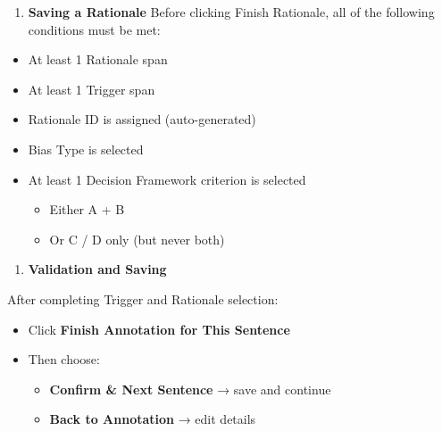 \documentclass[12pt,oneside,openright,a4paper]{cpe-english-project}
\begin{document}
\begin{enumerate}
\setlength{\itemsep}{0.15\baselineskip}
\setlength{\parsep}{0pt}
\setlength{\parskip}{0pt}
\def\labelenumi{\arabic{enumi})}
\setcounter{enumi}{4}
\item
  \textbf{Saving a Rationale}
  Before clicking Finish Rationale, all of the following conditions must
  be met:
\end{enumerate}

\begin{itemize}
\setlength{\itemsep}{0.15\baselineskip}
\setlength{\parsep}{0pt}
\setlength{\parskip}{0pt}
\item
  At least 1 Rationale span
\item
  At least 1 Trigger span
\item
  Rationale ID is assigned (auto-generated)
\item
  Bias Type is selected
\item
  At least 1 Decision Framework criterion is selected

  \begin{itemize}
\setlength{\itemsep}{0.15\baselineskip}
\setlength{\parsep}{0pt}
\setlength{\parskip}{0pt}
    \item
    Either A + B
  \item
    Or C / D only (but never both)
  \end{itemize}
\end{itemize}

\begin{enumerate}
\setlength{\itemsep}{0.15\baselineskip}
\setlength{\parsep}{0pt}
\setlength{\parskip}{0pt}
\def\labelenumi{\arabic{enumi})}
\setcounter{enumi}{5}
\item
  \textbf{Validation and Saving}
\end{enumerate}

After completing Trigger and Rationale selection:

\begin{itemize}
\setlength{\itemsep}{0.15\baselineskip}
\setlength{\parsep}{0pt}
\setlength{\parskip}{0pt}
\item
  Click \textbf{Finish Annotation for This Sentence}
\item
  Then choose:

  \begin{itemize}
\setlength{\itemsep}{0.15\baselineskip}
\setlength{\parsep}{0pt}
\setlength{\parskip}{0pt}
    \item
    \textbf{Confirm \& Next Sentence} → save and continue
  \item
    \textbf{Back to Annotation} → edit details
  \end{itemize}
\end{itemize}
\end{document}
